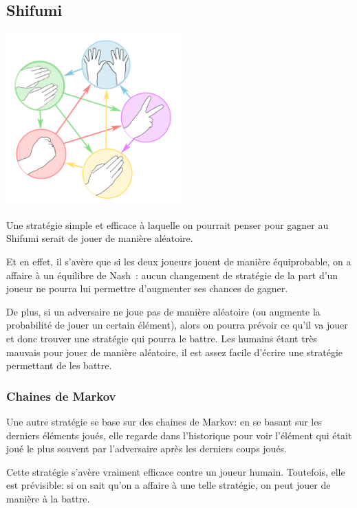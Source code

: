 \subsection{Shifumi}

    \begin{center}\includegraphics[width=0.5\textwidth]{shifumi.png}\end{center}

    Une stratégie simple et efficace à laquelle on pourrait penser pour gagner
    au Shifumi serait de jouer de manière aléatoire.

    Et en effet, il s'avère que si les deux joueurs jouent de manière équiprobable,
    on a affaire à un équilibre de Nash~: aucun changement de stratégie de la part
    d'un joueur ne pourra lui permettre d'augmenter ses chances de gagner.

    De plus, si un adversaire ne joue pas de manière aléatoire (ou augmente la
    probabilité de jouer un certain élément), alors on pourra prévoir ce qu'il
    va jouer et donc trouver une stratégie qui pourra le battre. Les humains
    étant très mauvais pour jouer de manière aléatoire, il est assez facile
    d'écrire une stratégie permettant de les battre.

  \subsubsection{Chaines de Markov}
    Une autre stratégie se base sur des chaines de Markov: en se basant sur les
    derniers éléments joués, elle regarde dans l'historique pour voir l'élément
    qui était joué le plus souvent par l'adversaire après les derniers coups
    joués.

    Cette stratégie s'avère vraiment efficace contre un joueur humain.
    Toutefois, elle est prévisible: si on sait qu'on a affaire à une telle
    stratégie, on peut jouer de manière à la battre.

